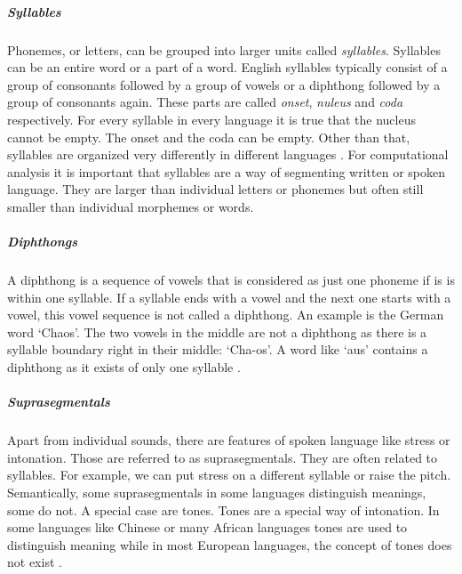 \subparagraph{Syllables} Phonemes, or letters, can be grouped into larger units called \textit{syllables}. Syllables can be an entire word or a part of a word. English syllables typically consist of a group of consonants followed by a group of vowels or a diphthong followed by a group of consonants again. These parts are called \textit{onset}, \textit{nuleus} and \textit{coda} respectively.  For every syllable in every language it is true that the nucleus cannot be empty. The onset and the coda can be empty. Other than that, syllables are organized very differently in different languages \citep{Intro.2007}. For computational analysis it is important that syllables are a way of segmenting written or spoken language. They are larger than individual letters or phonemes but often still smaller than individual morphemes or words. 

\subparagraph{Diphthongs}
A diphthong is a sequence of vowels that is considered as just one phoneme if is is within one syllable. If a syllable ends with a vowel and the next one starts with a vowel, this vowel sequence is not called a diphthong. An example is the German word `Chaos'. The two vowels in the middle are not a diphthong as there is a syllable boundary right in their middle: `Cha-os'. A word like `aus' contains a diphthong as it exists of only one syllable \citep{Intro.2007}. 

\subparagraph{Suprasegmentals} Apart from individual sounds, there are features of spoken language like stress or intonation. Those are referred to as suprasegmentals. They are often related to syllables. For example, we can put stress on a different syllable or raise the pitch. Semantically, some suprasegmentals in some languages distinguish meanings, some do not. A special case are tones. Tones are a special way of intonation. In some languages like Chinese or many African languages tones are used to distinguish meaning while in most European languages, the concept of tones does not exist \citep{Intro.2007}.


